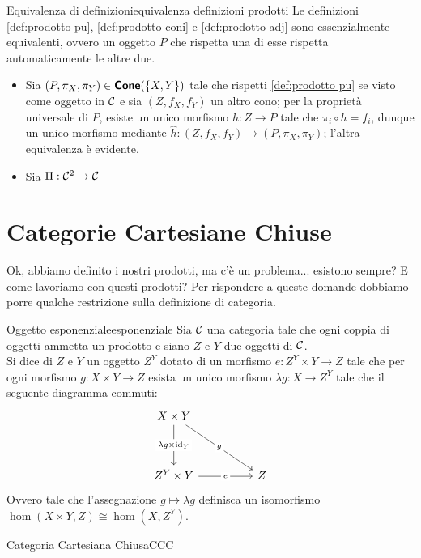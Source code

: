 \documentclass{article}
\renewcommand\C{\mc{C}}
\begin{document}
\begin{theorem}{Equivalenza di definizioni}{equivalenza definizioni prodotti}
    Le definizioni \ref{def:prodotto pu}, \ref{def:prodotto coni} e \ref{def:prodotto adj} sono essenzialmente equivalenti, ovvero un oggetto $P$ che rispetta una di esse rispetta automaticamente le altre due.
    \proof 
    \begin{itemize}
        \item Sia $(P,\pi_X,\pi_Y) \in \text{\sffamily\textbf{Cone}}(\{X,Y\})$ tale che rispetti \ref{def:prodotto pu} se visto come oggetto in $\C$ e sia $(Z,f_X,f_Y)$ un altro cono; per la proprietà universale di $P$, esiste un unico morfismo $h : Z\to P$ tale che $\pi_i\circ h = f_i$, dunque un unico morfismo mediante $\hat h : (Z,f_X,f_Y)\to (P,\pi_X,\pi_Y)$; l'altra equivalenza è evidente.
        \item Sia $\Pi : \C^2 \to \C$ 
    \end{itemize}
\end{theorem}

\section{Categorie Cartesiane Chiuse}

Ok, abbiamo definito i nostri prodotti, ma c'è un problema... esistono sempre? E come lavoriamo con questi prodotti? Per rispondere a queste domande dobbiamo porre qualche restrizione sulla definizione di categoria.

\begin{definition}{Oggetto esponenziale}{esponenziale}
    Sia $\C$ una categoria tale che ogni coppia di oggetti ammetta un prodotto e siano $Z$ e $Y$ due oggetti di $\C$.\\
    Si dice  di $Z$ e $Y$ un oggetto $Z^Y$ dotato di un morfismo $e: Z^Y\times Y \to Z$ tale che per ogni morfismo $g : X\times Y \to Z$ esista un unico morfismo $\lambda g : X\to Z^Y$ tale che il seguente diagramma commuti:
    \[\begin{tikzcd}
    	{X\times Y} \\
    	\\
    	{Z^Y\times Y} && Z
    	\arrow["{\lambda g\times \id_Y}"{description}, from=1-1, to=3-1]
    	\arrow["g"{description}, from=1-1, to=3-3]
    	\arrow["e"{description}, from=3-1, to=3-3]
    \end{tikzcd}\]
    Ovvero tale che l'assegnazione $g \mapsto \lambda g$ definisca un isomorfismo $\hom(X\times Y, Z)\cong \hom(X, Z^Y)$.
\end{definition}

\begin{definition}{Categoria Cartesiana Chiusa}{CCC}
    
\end{definition}
\end{document}
